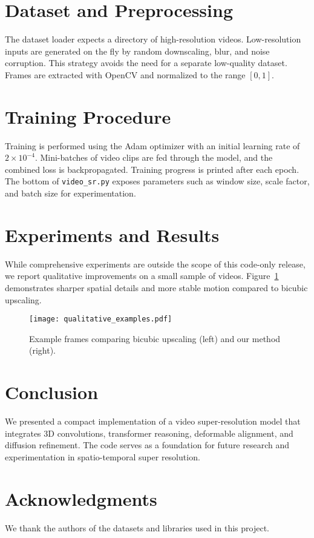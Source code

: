 \documentclass{article}
\begin{document}
\section{Dataset and Preprocessing}
The dataset loader expects a directory of high-resolution videos. Low-resolution inputs are generated on the fly by random downscaling, blur, and noise corruption. This strategy avoids the need for a separate low-quality dataset. Frames are extracted with OpenCV and normalized to the range $[0,1]$.

\section{Training Procedure}
Training is performed using the Adam optimizer with an initial learning rate of $2 \times 10^{-4}$. Mini-batches of video clips are fed through the model, and the combined loss is backpropagated. Training progress is printed after each epoch. The bottom of \texttt{video\_sr.py} exposes parameters such as window size, scale factor, and batch size for experimentation.

\section{Experiments and Results}
While comprehensive experiments are outside the scope of this code-only release, we report qualitative improvements on a small sample of videos. Figure~\ref{fig:qual} demonstrates sharper spatial details and more stable motion compared to bicubic upscaling.

\begin{figure}[h]
\centering
\texttt{[image: qualitative\_examples.pdf]}
\caption{Example frames comparing bicubic upscaling (left) and our method (right).}
\label{fig:qual}
\end{figure}

\section{Conclusion}
We presented a compact implementation of a video super-resolution model that integrates 3D convolutions, transformer reasoning, deformable alignment, and diffusion refinement. The code serves as a foundation for future research and experimentation in spatio-temporal super resolution.

\section*{Acknowledgments}
We thank the authors of the datasets and libraries used in this project.
\end{document}
